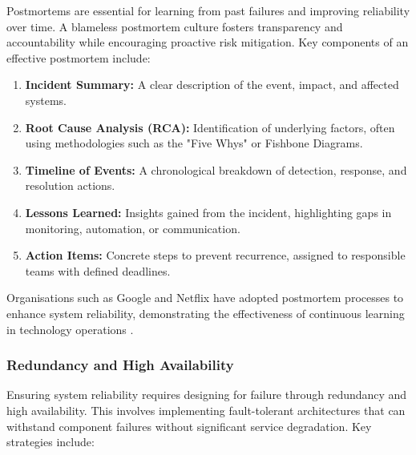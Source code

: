 Postmortems are essential for learning from past failures and improving reliability over time. A blameless postmortem culture fosters transparency and accountability while encouraging proactive risk mitigation. Key components of an effective postmortem include:

\begin{enumerate}
    \item \textbf{Incident Summary:} A clear description of the event, impact, and affected systems.
    \item \textbf{Root Cause Analysis (RCA):} Identification of underlying factors, often using methodologies such as the "Five Whys" or Fishbone Diagrams.
    \item \textbf{Timeline of Events:} A chronological breakdown of detection, response, and resolution actions.
    \item \textbf{Lessons Learned:} Insights gained from the incident, highlighting gaps in monitoring, automation, or communication.
    \item \textbf{Action Items:} Concrete steps to prevent recurrence, assigned to responsible teams with defined deadlines.
\end{enumerate}

Organisations such as Google and Netflix have adopted postmortem processes to enhance system reliability, demonstrating the effectiveness of continuous learning in technology operations \cite{allspaw2012postmortem}.

\subsubsection{Redundancy and High Availability}

Ensuring system reliability requires designing for failure through redundancy and high availability. This involves implementing fault-tolerant architectures that can withstand component failures without significant service degradation. Key strategies include:

